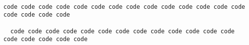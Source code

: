\documentclass{article}
\begin{document}
\begin{verbatim}

code code code code code code code code code code code code code code code code code code

  code code code code code code code code code code code code code code code code code code

\end{verbatim}
\end{document}
